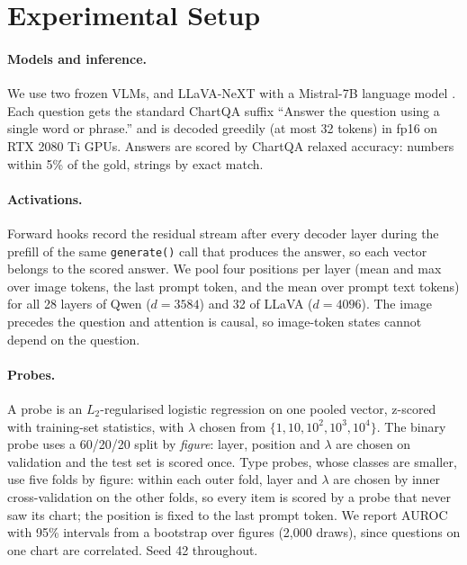 \section{Experimental Setup}
\label{sec:setup}

\paragraph{Models and inference.} We use two frozen VLMs, \qwen
\citep{bai2025qwen25vl} and LLaVA-NeXT with a Mistral-7B language model
\citep{liu2024llavanext}. Each question gets the standard ChartQA suffix
``Answer the question using a single word or phrase.'' and is decoded greedily
(at most 32 tokens) in fp16 on RTX 2080 Ti GPUs. Answers are scored by ChartQA
relaxed accuracy: numbers within 5\% of the gold, strings by exact match.

\paragraph{Activations.} Forward hooks record the residual stream after every
decoder layer during the prefill of the same \texttt{generate()} call that
produces the answer, so each vector belongs to the scored answer. We pool four
positions per layer (mean and max over image tokens, the last prompt token, and
the mean over prompt text tokens) for all 28 layers of Qwen ($d=3584$) and 32 of
LLaVA ($d=4096$). The image precedes the question and attention is causal, so
image-token states cannot depend on the question.

\paragraph{Probes.} A probe is an $L_2$-regularised logistic regression on one
pooled vector, z-scored with training-set statistics, with $\lambda$ chosen from
$\{1,10,10^2,10^3,10^4\}$. The binary probe uses a 60/20/20 split by
\emph{figure}: layer, position and $\lambda$ are chosen on validation and the test
set is scored once. Type probes, whose classes are smaller, use five folds by
figure: within each outer fold, layer and $\lambda$ are chosen by inner
cross-validation on the other folds, so every item is scored by a probe that
never saw its chart; the position is fixed to the last prompt token. We report
AUROC with 95\% intervals from a bootstrap over figures (2,000 draws), since
questions on one chart are correlated. Seed 42 throughout.

